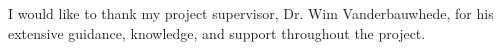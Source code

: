 I would like to thank my project supervisor, Dr. Wim Vanderbauwhede, for his
extensive guidance, knowledge, and support throughout the project.
